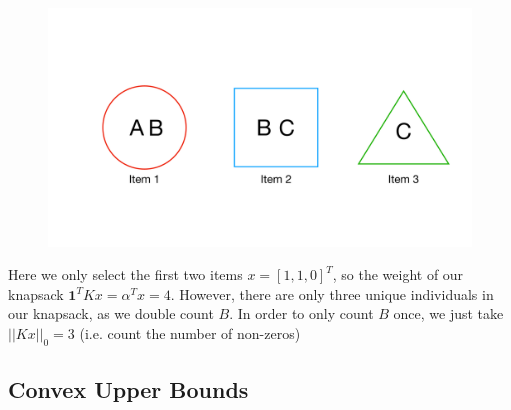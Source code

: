 \documentclass[12pt]{article}
\begin{document}
\begin{figure}[H]
    \centering
    \includegraphics[width = 14cm]{../images/knap_intuition.pdf}
    \label{fig:items}
\end{figure}
Here we only select the first two items $x = [1,1,0]^T$, so the weight of our knapsack $\mathbf{1}^TKx = \alpha^Tx = 4$. However, there are only three unique individuals in our knapsack, as we double count $B$. In order to only count $B$ once, we just take $||Kx||_0 = 3$ (i.e. count the number of non-zeros)

\subsection{Convex Upper Bounds}
\end{document}
